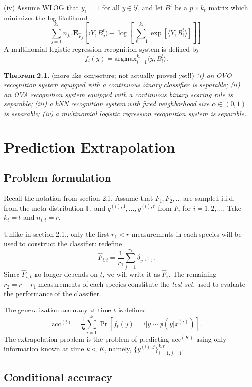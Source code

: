 \documentclass{article}
\newcommand{\E}{\textbf{E}}
\newcommand{\argmax}{\text{argmax}}
\begin{document}
(iv) Assume WLOG that $y_1 = 1$ for all $y \in \mathcal{Y}$, and let
$B^t$ be a $p \times k_t$ matrix which minimizes the log-likelihood
\[
\sum_{j=1}^{k_t}n_{j, t}\E_{\hat{F}_j}\left[\langle Y, B^t_j \rangle - \log\left[\sum_{\ell=1}^{k_t} \exp[\langle Y, B^t_\ell \rangle]\right]\right].
\]
A multinomial logistic regression recognition system is defined by
\[
f_t(y) = \argmax_{i=1}^{k_t} \langle y, B^t_i\rangle.
\]

\textbf{Theorem 2.1.}{\color{red} (more like conjecture; not actually
  proved yet!!)}  \emph{(i) an OVO recognition system equipped with a
  continuous binary classifier is separable; (ii) an OVA recognition
  system equipped with a continuous binary scoring rule is separable;
  (iii) a kNN recognition system with fixed neighborhood size $\alpha
  \in (0, 1)$ is separable; (iv) a multinomial logistic regression
  recognition system is separable.}

\section{Prediction Extrapolation}

\subsection{Problem formulation}

Recall the notation from section 2.1. Assume that $F_1,F_2, \hdots$
are sampled i.i.d. from the meta-distribution $\mathbb{F}$, and
$y^{(i), 1}, \hdots, y^{(i), r}$ from $F_i$ for $i = 1, 2, \hdots$.
Take $k_t = t$ and $n_{i, t} = r$.

Unlike in section 2.1., only the first $r_1 < r$ measurements in each
species will be used to construct the classifier: redefine
\[
\hat{F}_{i, t} = \frac{1}{r_1} \sum_{j=1}^{r_1} \delta_{y^{(i), j}}.
\]
Since $\hat{F}_{i, t}$ no longer depends on $t$, we will write it as
$\hat{F}_i$.  The remaining $r_2 = r - r_1$ measurements of each
species constitute the \emph{test set}, used to evaluate the
performance of the classifier.

The generalization accuracy at time $t$ is defined
\[
\text{acc}^{(t)} = \frac{1}{k}\sum_{i=1}^k \Pr[f_t(y) = i|y \sim p(y|x^{(i)})].
\]
The extrapolation problem is the problem of predicting
$\text{acc}^{(K)}$ using only information known at time $k < K$,
namely, $\{y^{(i), j}\}_{i=1, j=1}^{k, r}$.

\subsection{Conditional accuracy}
\end{document}
